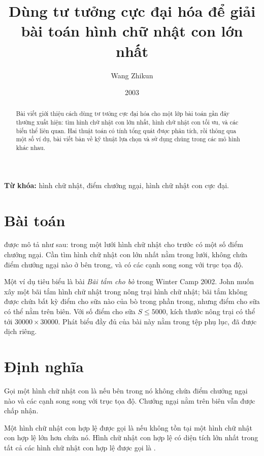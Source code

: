 \documentclass[11pt]{article}
\title{Dùng tư tưởng cực đại hóa để giải bài toán hình chữ nhật con lớn nhất}
\author{Wang Zhikun}
\date{2003}
\begin{document}
\maketitle


\begin{abstract}
Bài viết giới thiệu cách dùng tư tưởng cực đại hóa cho một lớp bài toán gần
đây thường xuất hiện: tìm hình chữ nhật con lớn nhất, hình chữ nhật con tối
ưu, và các biến thể liên quan. Hai thuật toán có tính tổng quát được phân
tích, rồi thông qua một số ví dụ, bài viết bàn về kỹ thuật lựa chọn và sử
dụng chúng trong các mô hình khác nhau.
\end{abstract}

\noindent\textbf{Từ khóa:} hình chữ nhật, điểm chướng ngại, hình chữ nhật con
cực đại.

\section{Bài toán}

 được mô tả như sau: trong một
lưới hình chữ nhật cho trước có một số điểm chướng ngại. Cần tìm hình chữ
nhật con lớn nhất nằm trong lưới, không chứa điểm chướng ngại nào ở bên trong,
và có các cạnh song song với trục tọa độ.

Một ví dụ tiêu biểu là bài \textit{Bãi tắm cho bò} trong Winter Camp 2002.
John muốn xây một bãi tắm hình chữ nhật trong nông trại hình chữ nhật; bãi
tắm không được chứa bất kỳ điểm cho sữa nào của bò trong phần trong, nhưng
điểm cho sữa có thể nằm trên biên. Với số điểm cho sữa \(S\le 5000\), kích
thước nông trại có thể tới \(30000\times 30000\). Phát biểu đầy đủ của bài
này nằm trong tệp phụ lục, đã được dịch riêng.

\section{Định nghĩa}

Gọi một hình chữ nhật con là  nếu bên trong nó không chứa điểm
chướng ngại nào và các cạnh song song với trục tọa độ. Chướng ngại nằm trên
biên vẫn được chấp nhận.

Một hình chữ nhật con hợp lệ được gọi là  nếu không tồn tại một
hình chữ nhật con hợp lệ lớn hơn chứa nó. Hình chữ nhật con hợp lệ có diện
tích lớn nhất trong tất cả các hình chữ nhật con hợp lệ được gọi là
.
\end{document}
